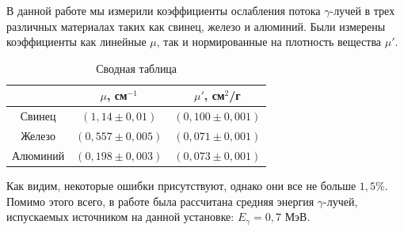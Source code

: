 	
	\newpage
	В данной работе мы измерили коэффициенты ослабления потока $\gamma$-лучей в трех различных материалах таких как свинец, железо и алюминий. Были измерены коэффициенты как линейные $\mu$, так и нормированные на плотность вещества $\mu'$.
	\begin{table}[h!]
		\centering
			\begin{tabular}{c|c|c|}
				\cline{2-3}
				& $\mu$, см$^{-1}$    & $\mu'$, см$^2$/г    \\ \hline
				\multicolumn{1}{|c|}{Свинец}   & $(1,14 \pm 0,01)$   & $(0,100 \pm 0,001)$ \\ \hline
				\multicolumn{1}{|c|}{Железо}   & $(0,557 \pm 0,005)$ & $(0,071 \pm 0,001)$ \\ \hline
				\multicolumn{1}{|c|}{Алюминий} & $(0,198 \pm 0,003)$ & $(0,073 \pm 0,001)$ \\ \hline
			\end{tabular}
		\caption{Сводная таблица}
	\end{table}
	Как видим, некоторые ошибки присутствуют, однако они все не больше $1,5\%$. Помимо этого всего, в работе была рассчитана средняя энергия $\gamma$-лучей, испускаемых источником на данной установке: $E_\gamma = 0,7$ МэВ.
	
